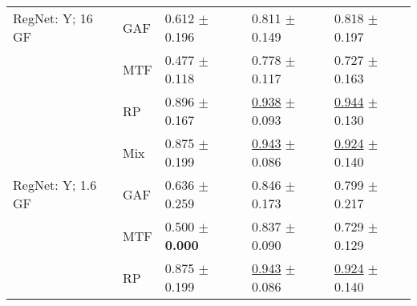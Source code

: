 \begin{tabular}[t]{lllll}
RegNet: Y; 16 GF & GAF & \textcolor[rgb]{0.5904411765,0.4095588235,0}{0.612} $\pm$ \textcolor[rgb]{0.6989046730,0.3010953270,0}{0.196} & \textcolor[rgb]{0.4817095255,0.5000000000,0}{0.811} $\pm$ \textcolor[rgb]{0.4892671359,0.5000000000,0}{0.149} & \textcolor[rgb]{0.4712041885,0.5000000000,0}{0.818} $\pm$ \textcolor[rgb]{0.4681931484,0.5000000000,0}{0.197} \\
 & MTF & \textcolor[rgb]{0.8529411765,0.1470588235,0}{0.477} $\pm$ \textcolor[rgb]{0.4231220368,0.5000000000,0}{0.118} & \textcolor[rgb]{0.5903658095,0.4096341905,0}{0.778} $\pm$ \textcolor[rgb]{0.3129578004,0.5000000000,0}{0.117} & \textcolor[rgb]{0.7539267016,0.2460732984,0}{0.727} $\pm$ \textcolor[rgb]{0.3038066358,0.5000000000,0}{0.163} \\
 & RP & \textcolor[rgb]{0.0404411765,0.5000000000,0}{0.896} $\pm$ \textcolor[rgb]{0.5973732826,0.4026267174,0}{0.167} & \underline{\textcolor[rgb]{0.0557768924,0.5000000000,0}{0.938}} $\pm$ \textcolor[rgb]{0.1771602221,0.5000000000,0}{0.093} & \underline{\textcolor[rgb]{0.0785340314,0.5000000000,0}{0.944}} $\pm$ \textcolor[rgb]{0.1425478198,0.5000000000,0}{0.130} \\
 & Mix & \textcolor[rgb]{0.0808823529,0.5000000000,0}{0.875} $\pm$ \textcolor[rgb]{0.7127864450,0.2872135550,0}{0.199} & \underline{\textcolor[rgb]{0.0398406375,0.5000000000,0}{0.943}} $\pm$ \textcolor[rgb]{0.1408376023,0.5000000000,0}{0.086} & \underline{\textcolor[rgb]{0.1433246073,0.5000000000,0}{0.924}} $\pm$ \textcolor[rgb]{0.1910808871,0.5000000000,0}{0.140} \\
RegNet: Y; 1.6 GF & GAF & \textcolor[rgb]{0.5441176471,0.4558823529,0}{0.636} $\pm$ \textcolor[rgb]{0.9254467099,0.0745532901,0}{0.259} & \textcolor[rgb]{0.3638778220,0.5000000000,0}{0.846} $\pm$ \textcolor[rgb]{0.6251896337,0.3748103663,0}{0.173} & \textcolor[rgb]{0.5320680628,0.4679319372,0}{0.799} $\pm$ \textcolor[rgb]{0.5701337530,0.4298662470,0}{0.217} \\
 & MTF & \textcolor[rgb]{0.8088235294,0.1911764706,0}{0.500} $\pm$ \textbf{\textcolor[rgb]{0.0000000000,0.5000000000,0}{0.000}} & \textcolor[rgb]{0.3930942895,0.5000000000,0}{0.837} $\pm$ \textcolor[rgb]{0.1599508149,0.5000000000,0}{0.090} & \textcolor[rgb]{0.7480366492,0.2519633508,0}{0.729} $\pm$ \textcolor[rgb]{0.1375876474,0.5000000000,0}{0.129} \\
 & RP & \textcolor[rgb]{0.0808823529,0.5000000000,0}{0.875} $\pm$ \textcolor[rgb]{0.7127864450,0.2872135550,0}{0.199} & \underline{\textcolor[rgb]{0.0398406375,0.5000000000,0}{0.943}} $\pm$ \textcolor[rgb]{0.1408376023,0.5000000000,0}{0.086} & \underline{\textcolor[rgb]{0.1433246073,0.5000000000,0}{0.924}} $\pm$ \textcolor[rgb]{0.1910808871,0.5000000000,0}{0.140} \\

\end{tabular}
